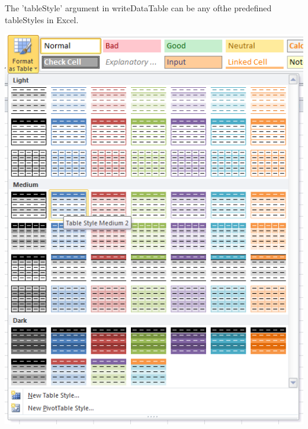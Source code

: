 \documentclass[11pt]{article}\usepackage[]{graphicx}\usepackage[]{color}
\begin{document}
\noindent
The 'tableStyle' argument in writeDataTable can be any ofthe predefined tableStyles in Excel.

\begin{center}
\includegraphics[width=14cm]{tableStyles}
\end{center}

\newpage
\end{document}
